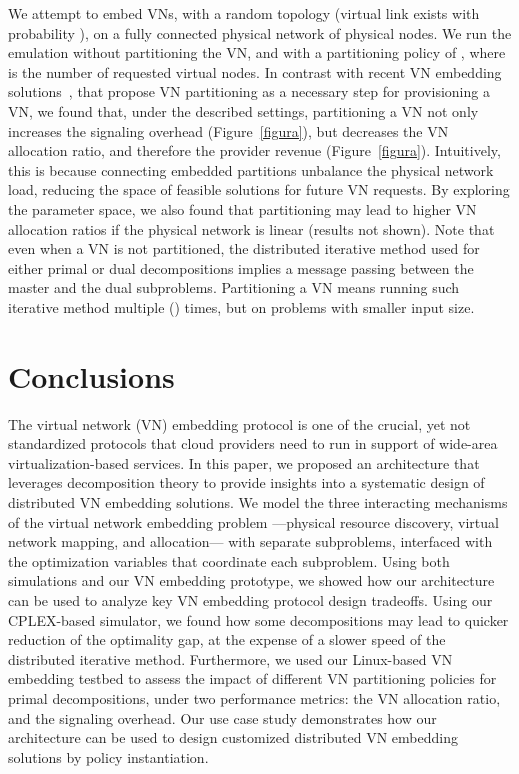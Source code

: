 \documentclass[a4paper, 10pt, conference]{ieeeconf}
\begin{document}
We attempt to embed  VNs, with a random topology (virtual link exists with probability ), on a fully connected physical network of  physical nodes.
We run the emulation without partitioning the VN, and with a partitioning policy of , where  is the number of requested virtual nodes. In contrast with recent VN embedding solutions~\cite{Houidi2011}, that propose VN partitioning as a necessary step for provisioning a VN, we found that, under the described settings, partitioning a VN not only increases the signaling overhead (Figure~\ref{figura}), but decreases the VN allocation ratio, and therefore the provider revenue (Figure~\ref{figura}). Intuitively, this is because connecting  embedded partitions unbalance the physical network load, reducing the space of feasible solutions for future VN requests.  By exploring the parameter space, we also found that partitioning may lead to higher VN allocation ratios if the physical network is linear (results not shown).   Note that even when a VN is not partitioned, the distributed iterative method used for either primal or dual decompositions implies a message passing between the master and the dual subproblems. Partitioning a VN means running such iterative method multiple () times, but on problems with smaller input size.


\vspace{-2mm}
\section{Conclusions}
\vspace{-1mm}


The virtual network (VN) embedding protocol is one of the crucial, yet not standardized protocols that cloud providers need to run in support of wide-area virtualization-based services.
In this paper, we proposed an architecture that leverages decomposition theory to provide insights into a systematic design of distributed VN embedding solutions. 
We model the three interacting mechanisms of the virtual network embedding problem ---physical resource discovery, virtual network mapping, and allocation--- with separate subproblems, interfaced with the optimization variables that coordinate each subproblem. 
Using both simulations and our VN embedding prototype, we showed how our architecture can be used to analyze key VN embedding protocol design tradeoffs. Using our CPLEX-based simulator, we found how some decompositions may lead to quicker reduction of the optimality gap, at the expense of a slower speed of the distributed iterative method. Furthermore, we used our Linux-based VN embedding testbed to assess the impact of different VN partitioning policies for primal decompositions, under two performance metrics: the VN allocation ratio, and the signaling overhead. Our use case study demonstrates how our architecture can be used to design customized distributed VN embedding solutions by policy instantiation. 









\end{document}
